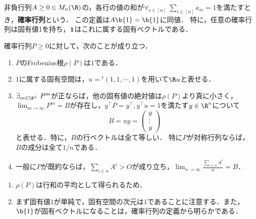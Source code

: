 \documentclass[uplatex, dvipdfmx]{jsreport}
\begin{document}
\begin{definition}
    非負行列$A\ge0\in M_n(\R)$の，各行の値の和が$\forall_{s\in[n]}\;\sum_{i\in[n]}a_{si}=1$を満たすとき，\textbf{確率行列}という．
    この定義は$A\b{1}=\b{1}$に同値．
    特に，任意の確率行列は固有値1を持ち，$\bf{1}$はこれに属する固有ベクトルである．
\end{definition}

\begin{corollary}[確率行列の性質]
    確率行列$P\ge0$に対して，次のことが成り立つ．
    \begin{enumerate}
        \item $P$のFrobenius根$\rho(P)$は$1$である．
        \item $1$に属する固有空間は，$u={}^t\!(1,1,\cdots,1)$を用いて$\R u$と表せる．
        \item $\exists_{m\in\N^+}\;P^m$が正ならば，他の固有値の絶対値は$\rho(P)$より真に小さく，
        $\lim_{m\to\infty}P^m=B$が存在し，$y^\top P=y^\top,y^\top u=1$を満たす$y\in\R^n$について
        \[B=uy=\begin{pmatrix}y\\\vdots\\ y\end{pmatrix}\]
        と表せる．特に，$B$の行ベクトルは全て等しい．
        特に$P$が対称行列ならば，$B$の成分は全て$1/n$である．
        \item 一般に$P$が既約ならば，$\sum_{i\in n}A^i>O$が成り立ち，$\lim_{n\to\infty}\frac{\sum_{i\in n}A^i}{n}=B$．
    \end{enumerate}
\end{corollary}
\begin{Proof}\mbox{}
    \begin{enumerate}
        \item $\rho(P)$は行和の平均として得られるため．
        \item まず固有値$1$が単純で，固有空間の次元は$1$であることに注意する．また，$\b{1}$が固有ベクトルになることは，確率行列の定義から明らかである．
    \end{enumerate}
\end{Proof}
\end{document}
